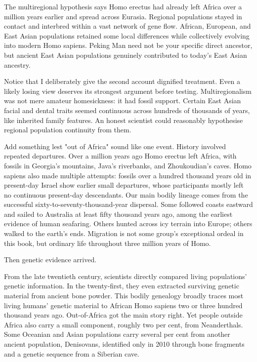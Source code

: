 The multiregional hypothesis says Homo erectus had already left Africa over a million years earlier and spread across Eurasia. Regional populations stayed in contact and interbred within a vast network of gene flow. African, European, and East Asian populations retained some local differences while collectively evolving into modern Homo sapiens. Peking Man need not be your specific direct ancestor, but ancient East Asian populations genuinely contributed to today's East Asian ancestry.

Notice that I deliberately give the second account dignified treatment. Even a likely losing view deserves its strongest argument before testing. Multiregionalism was not mere amateur homesickness: it had fossil support. Certain East Asian facial and dental traits seemed continuous across hundreds of thousands of years, like inherited family features. An honest scientist could reasonably hypothesise regional population continuity from them.

Add something lest "out of Africa" sound like one event. History involved repeated departures. Over a million years ago Homo erectus left Africa, with fossils in Georgia's mountains, Java's riverbanks, and Zhoukoudian's caves. Homo sapiens also made multiple attempts: fossils over a hundred thousand years old in present-day Israel show earlier small departures, whose participants mostly left no continuous present-day descendants. Our main bodily lineage comes from the successful sixty-to-seventy-thousand-year dispersal. Some followed coasts eastward and sailed to Australia at least fifty thousand years ago, among the earliest evidence of human seafaring. Others hunted across icy terrain into Europe; others walked to the earth's ends. Migration is not some group's exceptional ordeal in this book, but ordinary life throughout three million years of Homo.

Then genetic evidence arrived.

From the late twentieth century, scientists directly compared living populations' genetic information. In the twenty-first, they even extracted surviving genetic material from ancient bone powder. This bodily genealogy broadly traces most living humans' genetic material to African Homo sapiens two or three hundred thousand years ago. Out-of-Africa got the main story right. Yet people outside Africa also carry a small component, roughly two per cent, from Neanderthals. Some Oceanian and Asian populations carry several per cent from another ancient population, Denisovans, identified only in 2010 through bone fragments and a genetic sequence from a Siberian cave.


